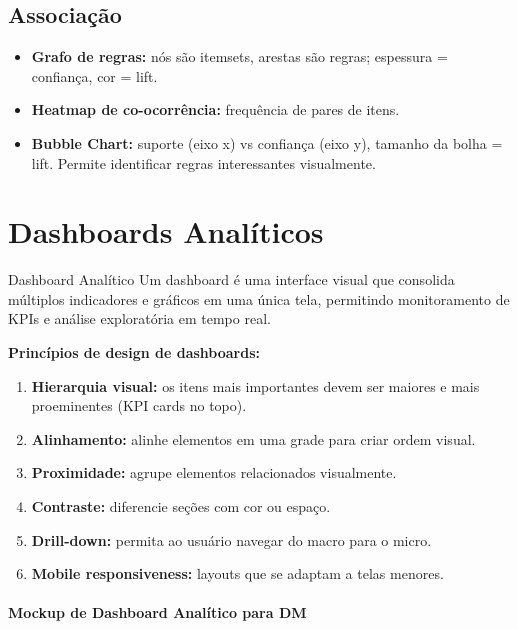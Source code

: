 \documentclass[12pt,a4paper]{article}
\begin{document}
\subsection{Associação}

\begin{itemize}
  \item \textbf{Grafo de regras:} nós são itemsets, arestas são regras; espessura = confiança, cor = lift.
  \item \textbf{Heatmap de co-ocorrência:} frequência de pares de itens.
  \item \textbf{Bubble Chart:} suporte (eixo x) vs confiança (eixo y), tamanho da bolha = lift. Permite identificar regras interessantes visualmente.
\end{itemize}

\section{Dashboards Analíticos}

\begin{definicaobox}{Dashboard Analítico}
Um dashboard é uma interface visual que consolida múltiplos indicadores e gráficos em uma única tela, permitindo monitoramento de KPIs e análise exploratória em tempo real.
\end{definicaobox}

\textbf{Princípios de design de dashboards:}
\begin{enumerate}
  \item \textbf{Hierarquia visual:} os itens mais importantes devem ser maiores e mais proeminentes (KPI cards no topo).
  \item \textbf{Alinhamento:} alinhe elementos em uma grade para criar ordem visual.
  \item \textbf{Proximidade:} agrupe elementos relacionados visualmente.
  \item \textbf{Contraste:} diferencie seções com cor ou espaço.
  \item \textbf{Drill-down:} permita ao usuário navegar do macro para o micro.
  \item \textbf{Mobile responsiveness:} layouts que se adaptam a telas menores.
\end{enumerate}

\paragraph{Mockup de Dashboard Analítico para DM}
\end{document}

